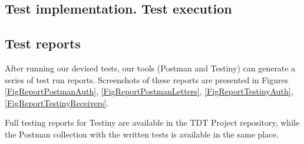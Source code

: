 \documentclass{article}
\begin{document}
\subsection{Test implementation. Test execution}

\subsection{Test reports}

After running our devised tests, our tools (Postman and Testiny) can generate a series of test run reports. Screenshots of these reports are presented in Figures \ref{FigReportPostmanAuth}, \ref{FigReportPostmanLetters}, \ref{FigReportTestinyAuth}, \ref{FigReportTestinyReceivers}.

Full testing reports for Testiny are available in the TDT Project repository, while the Postman collection with the written tests is available in the same place.
\end{document}
